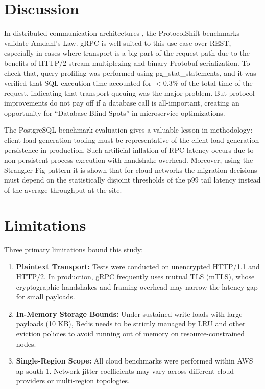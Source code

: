 \documentclass[conference]{IEEEtran}
\begin{document}
\section{Discussion}
In distributed communication architectures \cite{amdahl1967}, the ProtocolShift benchmarks validate Amdahl's Law. gRPC is well suited to this use case over REST, especially in cases where transport is a big part of the request path due to the benefits of HTTP/2 stream multiplexing and binary Protobuf serialization. To check that, query profiling was performed using pg\_stat\_statements, and it was verified that SQL execution time accounted for $<0.3\%$ of the total time of the request, indicating that transport queuing was the major problem. But protocol improvements do not pay off if a database call is all-important, creating an opportunity for ``Database Blind Spots'' in microservice optimizations.

The PostgreSQL benchmark evaluation gives a valuable lesson in methodology: client load-generation tooling must be representative of the client load-generation persistence in production. Such artificial inflation of RPC latency occurs due to non-persistent process execution with handshake overhead. Moreover, using the Strangler Fig pattern \cite{li2020} it is shown that for cloud networks the migration decisions must depend on the statistically disjoint thresholds of the p99 tail latency instead of the average throughput at the site.


\section{Limitations}
Three primary limitations bound this study:
\begin{enumerate}
    \item \textbf{Plaintext Transport:} Tests were conducted on unencrypted HTTP/1.1 and HTTP/2. In production, gRPC frequently uses mutual TLS (mTLS), whose cryptographic handshakes and framing overhead may narrow the latency gap for small payloads.
    \item \textbf{In-Memory Storage Bounds:} Under sustained write loads with large payloads (10 KB), Redis needs to be strictly managed by LRU and other eviction policies to avoid running out of memory on resource-constrained nodes.
    \item \textbf{Single-Region Scope:} All cloud benchmarks were performed within AWS ap-south-1. Network jitter coefficients may vary across different cloud providers or multi-region topologies.
\end{enumerate}
\end{document}
